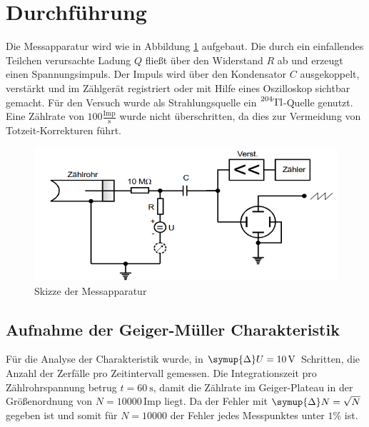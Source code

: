 \section{Durchführung}
\label{sec:Durchführung}
Die Messapparatur wird wie in Abbildung \ref{fig:Schalt} aufgebaut.
Die durch ein einfallendes Teilchen verursachte Ladung $Q$ fließt über den Widerstand $R$ ab und erzeugt einen Spannungsimpuls.
Der Impuls wird über den Kondensator $C$ ausgekoppelt, verstärkt und im Zählgerät registriert oder mit Hilfe eines Oszilloskop sichtbar gemacht.
Für den Versuch wurde als Strahlungsquelle ein $\ce{^{204}Tl}$-Quelle genutzt.
Eine Zählrate von $100 \frac{\text{Imp}}{\text{s}}$ wurde nicht überschritten, da dies zur Vermeidung von Totzeit-Korrekturen führt.
\begin{figure}
    \centering
    \includegraphics[scale=0.6]{pics/Schalt.png}
    \caption{Skizze der Messapparatur}
    \label{fig:Schalt}
  \end{figure}
\subsection{Aufnahme der Geiger-Müller Charakteristik}
Für die Analyse der Charakteristik wurde, in $\symup{\Delta}U=\SI{10}{\volt}$ Schritten, die Anzahl der Zerfälle pro Zeitintervall gemessen.
Die Integrationszeit pro Zählrohrspannung betrug $t=\SI{60}{\second}$, damit die Zählrate im Geiger-Plateau in der Größenordnung von $N=10000\,  \text{Imp}$ liegt.
Da der Fehler mit $\symup{\Delta}N=\sqrt{N}$ gegeben ist und somit für $N=10000$ der Fehler jedes Messpunktes unter $1\% $ ist.
